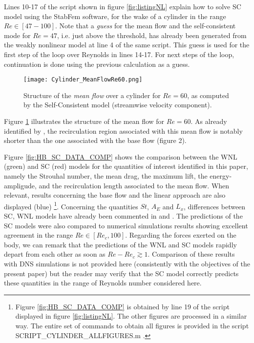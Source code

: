 \documentclass[twocolumn,10pt]{asme2ej}
\begin{document}
 
Lines 10-17 of the script shown in figure \ref{fig:listingNL}  explain how to solve SC model using the StabFem software, 
for the wake of a cylinder in the range $Re \in [47-100] $. Note that a {\em guess} for the mean flow and the self-consistent mode for $Re = 47$, i.e. just above the threshold, has already been generated from the weakly nonlinear model at line 4 of the same script. This guess is used for the first step of the loop over Reynolds in lines 14-17. For next steps of the loop, continuation is done using the previous calculation as a guess. 

\begin{figure}
\begin{center}
\texttt{[image: Cylinder\_MeanFlowRe60.png]}
\end{center}
\caption{Structure of the {\em mean flow} over a cylinder for $Re = 
60$, as computed by the Self-Consistent model (streamwise velocity component).}
\label{fig:MF60}
\end{figure}



Figure \ref{fig:MF60} illustrates the structure of the mean flow for $Re=60$. As already identified by  \cite{MLugo2014}, the recirculation region associated with this mean flow is notably shorter than the one associated with the base flow (figure 2). 



 

Figure \ref{fig:HB_SC_DATA_COMP} shows the comparison between the WNL (green) and SC (red) models for the quantities of interest identified in this paper, namely the Strouhal number, the mean drag, the maximum lift, the energy-ampligude, and the recirculation length associated to the mean flow. When relevant, results concerning the base flow and the linear approach are also displayed (blue)
\footnote{Figure   \ref{fig:HB_SC_DATA_COMP} is obtained by line 19 of the script displayed in figure \ref{fig:listingNL}. The other figures are processed in a similar way. The entire set of commands to obtain all figures is provided in the script {\sf SCRIPT\_CYLINDER\_ALLFIGURES.m} .}.
Concerning the quantities $St$, $A_E$ and $L_x$, differences between SC, WNL models have already been commented in  \cite{MLugo2014} and \cite{FDR2016}. The predictions of the SC models were also compared to numerical simulations results showing excellent agreement in the range $Re \in [Re_c,100]$. Regarding the forces exerted on the body, we can remark that the predictions of the WNL and SC models rapidly depart from each other as soon as $Re-Re_c \gtrsim 1$. Comparison of these results with DNS simulations is not provided here (consistently with the objectives of the present paper) but the reader may verify that the SC model correctly predicts these quantities in the range of Reynolds number considered here.
\end{document}
